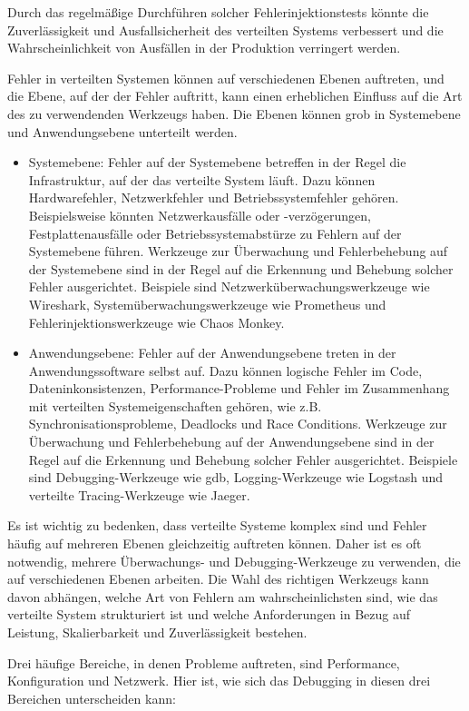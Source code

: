 Durch das regelmäßige Durchführen solcher Fehlerinjektionstests könnte die Zuverlässigkeit und Ausfallsicherheit des verteilten Systems verbessert und die Wahrscheinlichkeit von Ausfällen in der Produktion verringert werden.

Fehler in verteilten Systemen können auf verschiedenen Ebenen auftreten, und die Ebene, auf der der Fehler auftritt, kann einen erheblichen Einfluss auf die Art des zu verwendenden Werkzeugs haben. Die Ebenen können grob in Systemebene und Anwendungsebene unterteilt werden.

\begin{itemize}
\item Systemebene: Fehler auf der Systemebene betreffen in der Regel die Infrastruktur, auf der das verteilte System läuft. Dazu können Hardwarefehler, Netzwerkfehler und Betriebssystemfehler gehören. Beispielsweise könnten Netzwerkausfälle oder -verzögerungen, Festplattenausfälle oder Betriebssystemabstürze zu Fehlern auf der Systemebene führen. Werkzeuge zur Überwachung und Fehlerbehebung auf der Systemebene sind in der Regel auf die Erkennung und Behebung solcher Fehler ausgerichtet. Beispiele sind Netzwerküberwachungswerkzeuge wie Wireshark, Systemüberwachungswerkzeuge wie Prometheus und Fehlerinjektionswerkzeuge wie Chaos Monkey.
\item Anwendungsebene: Fehler auf der Anwendungsebene treten in der Anwendungssoftware selbst auf. Dazu können logische Fehler im Code, Dateninkonsistenzen, Performance-Probleme und Fehler im Zusammenhang mit verteilten Systemeigenschaften gehören, wie z.B. Synchronisationsprobleme, Deadlocks und Race Conditions. Werkzeuge zur Überwachung und Fehlerbehebung auf der Anwendungsebene sind in der Regel auf die Erkennung und Behebung solcher Fehler ausgerichtet. Beispiele sind Debugging-Werkzeuge wie gdb, Logging-Werkzeuge wie Logstash und verteilte Tracing-Werkzeuge wie Jaeger.
\end{itemize}
Es ist wichtig zu bedenken, dass verteilte Systeme komplex sind und Fehler häufig auf mehreren Ebenen gleichzeitig auftreten können. Daher ist es oft notwendig, mehrere Überwachungs- und Debugging-Werkzeuge zu verwenden, die auf verschiedenen Ebenen arbeiten. Die Wahl des richtigen Werkzeugs kann davon abhängen, welche Art von Fehlern am wahrscheinlichsten sind, wie das verteilte System strukturiert ist und welche Anforderungen in Bezug auf Leistung, Skalierbarkeit und Zuverlässigkeit bestehen.

Drei häufige Bereiche, in denen Probleme auftreten, sind Performance, Konfiguration und Netzwerk. Hier ist, wie sich das Debugging in diesen drei Bereichen unterscheiden kann:

